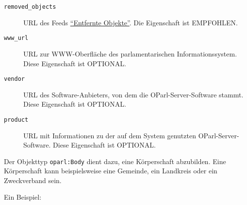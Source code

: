 \documentclass[,a4paper]{article}
\begin{document}
\begin{description}
\item[\texttt{removed\_objects}]
URL des Feeds \hyperref[feedux5fentfernteux5fobjekte]{``Entfernte
Objekte''}. Die Eigenschaft ist EMPFOHLEN.
\item[\texttt{www\_url}]
URL zur WWW-Oberfläche des parlamentarischen Informationssystem. Diese
Eigenschaft ist OPTIONAL.
\item[\texttt{vendor}]
URL des Software-Anbieters, von dem die OParl-Server-Software stammt.
Diese Eigenschaft ist OPTIONAL.
\item[\texttt{product}]
URL mit Informationen zu der auf dem System genutzten
OParl-Server-Software. Diese Eigenschaft ist OPTIONAL.
\end{description}


Der Objekttyp \texttt{oparl:Body} dient dazu, eine Körperschaft
abzubilden. Eine Körperschaft kann beispielsweise eine Gemeinde, ein
Landkreis oder ein Zweckverband sein.

Ein Beispiel:
\end{document}
